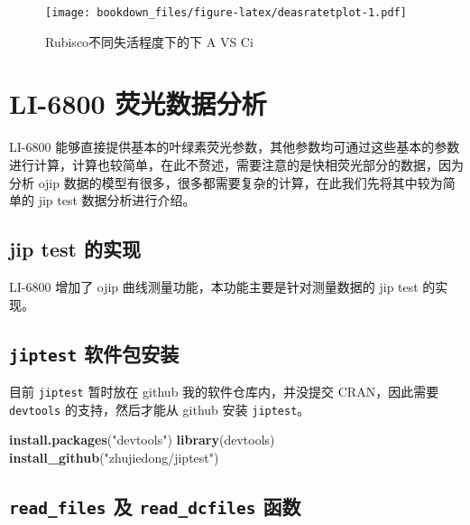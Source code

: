 \documentclass[
]{krantz}
\makeatletter
\newenvironment{Shaded}{\begin{snugshade}}{\end{snugshade}}
\newcommand{\KeywordTok}[1]{\textcolor[rgb]{0.13,0.29,0.53}{\textbf{#1}}}
\newcommand{\NormalTok}[1]{#1}
\newcommand{\StringTok}[1]{\textcolor[rgb]{0.31,0.60,0.02}{#1}}
\newenvironment{kframe}{%
\medskip{}
\setlength{\fboxsep}{.8em}
 \def\at@end@of@kframe{}%
 \ifinner\ifhmode%
  \def\at@end@of@kframe{\end{minipage}}%
  \begin{minipage}{\columnwidth}%
 \fi\fi%
 \def\FrameCommand##1{\hskip\@totalleftmargin \hskip-\fboxsep
 \colorbox{shadecolor}{##1}\hskip-\fboxsep
     \hskip-\linewidth \hskip-\@totalleftmargin \hskip\columnwidth}%
 \MakeFramed {\advance\hsize-\width
   \@totalleftmargin\z@ \linewidth\hsize
   \@setminipage}}%
 {\par\unskip\endMakeFramed%
 \at@end@of@kframe}
\renewenvironment{Shaded}{\begin{kframe}}{\end{kframe}}
\makeatother
\begin{document}
\begin{figure}
\centering
\texttt{[image: bookdown\_files/figure-latex/deasratetplot-1.pdf]}
\caption{\label{fig:deasratetplot}Rubisco不同失活程度下的下 A VS Ci}
\end{figure}

\cleardoublepage

\hypertarget{fluro68}{%
\section{LI-6800 荧光数据分析}\label{fluro68}}

LI-6800 能够直接提供基本的叶绿素荧光参数，其他参数均可通过这些基本的参数进行计算，计算也较简单，在此不赘述，需要注意的是快相荧光部分的数据，因为分析 ojip 数据的模型有很多，很多都需要复杂的计算，在此我们先将其中较为简单的 jip test 数据分析进行介绍。

\hypertarget{jiptest}{%
\subsection{jip test 的实现}\label{jiptest}}

LI-6800 增加了 ojip 曲线测量功能，本功能主要是针对测量数据的 jip test 的实现。

\hypertarget{jiptest_pack}{%
\subsection{\texorpdfstring{\texttt{jiptest} 软件包安装}{jiptest 软件包安装}}\label{jiptest_pack}}

目前 \texttt{jiptest} 暂时放在 github 我的软件仓库内，并没提交 CRAN，因此需要 \texttt{devtools} 的支持，然后才能从 github 安装 \texttt{jiptest}。

\begin{Shaded}
\begin{Highlighting}[]
\KeywordTok{install.packages}\NormalTok{(}\StringTok{"devtools"}\NormalTok{)}
\KeywordTok{library}\NormalTok{(devtools)}
\KeywordTok{install_github}\NormalTok{(}\StringTok{"zhujiedong/jiptest"}\NormalTok{)}
\end{Highlighting}
\end{Shaded}

\hypertarget{readfluor}{%
\subsection{\texorpdfstring{\texttt{read\_files} 及 \texttt{read\_dcfiles} 函数}{read\_files 及 read\_dcfiles 函数}}\label{readfluor}}
\end{document}

